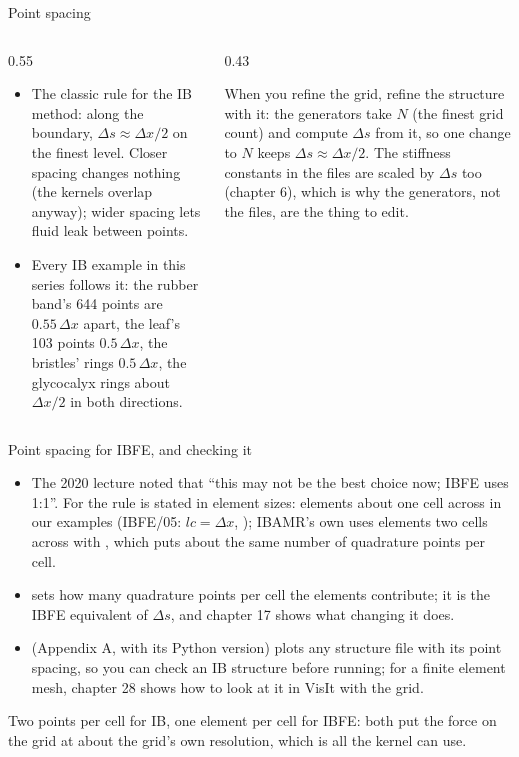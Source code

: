 \documentclass[aspectratio=169,11pt]{beamer}
\begin{document}
\begin{frame}{Point spacing}
\begin{columns}[T,onlytextwidth]
\begin{column}{0.55\textwidth}
\begin{itemize}
  \item The classic rule for the IB method:  along the boundary, $\Delta s \approx \Delta x/2$ on the finest level. Closer spacing changes nothing (the kernels overlap anyway); wider spacing lets fluid leak between points.
  \item Every IB example in this series follows it: the rubber band's 644 points are $0.55\,\Delta x$ apart, the leaf's 103 points $0.5\,\Delta x$, the bristles' rings $0.5\,\Delta x$, the glycocalyx rings about $\Delta x/2$ in both directions.
\end{itemize}
\end{column}
\begin{column}{0.43\textwidth}
\begin{punchbox}
\small When you refine the grid, refine the structure with it: the generators take $N$ (the finest grid count) and compute $\Delta s$ from it, so one change to $N$ keeps $\Delta s \approx \Delta x/2$. The stiffness constants in the files are scaled by $\Delta s$ too (chapter 6), which is why the generators, not the files, are the thing to edit.
\end{punchbox}
\end{column}
\end{columns}
\end{frame}

\begin{frame}{Point spacing for IBFE, and checking it}
\begin{itemize}
  \item The 2020 lecture noted that ``this may not be the best choice now; IBFE uses 1:1''. For  the rule is stated in element sizes: elements about one cell across in our examples (IBFE/05: $lc = \Delta x$, ); IBAMR's own  uses elements two cells across with , which puts about the same number of quadrature points per cell.
  \item {} sets how many quadrature points per cell the elements contribute; it is the IBFE equivalent of $\Delta s$, and chapter 17 shows what changing it does.
  \item {} (Appendix A, with its Python version) plots any structure file with its point spacing, so you can check an IB structure before running; for a finite element mesh, chapter 28 shows how to look at it in VisIt with the grid.
\end{itemize}
\vspace{2mm}
\begin{punchbox}
\small Two points per cell for IB, one element per cell for IBFE: both put the force on the grid at about the grid's own resolution, which is all the kernel can use.
\end{punchbox}
\end{frame}
\end{document}
